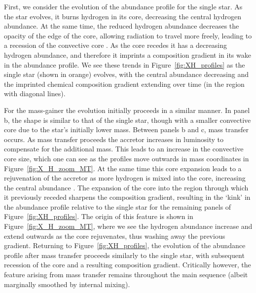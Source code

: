 \documentclass[twocolumn, twocolappendix, oneside]{aastex631}
\begin{document}
First, we consider the evolution of the abundance profile for the single star. As the star evolves, it burns hydrogen in its core, decreasing the central hydrogen abundance. At the same time, the reduced hydrogen abundance decreases the opacity of the edge of the core, allowing radiation to travel more freely, leading to a recession of the convective core \citep{Mitalas+1972,Crowe+1982,Miglio+2008,SilvaAguirre+2011}. As the core recedes it has a decreasing hydrogen abundance, and therefore it imprints a composition gradient in its wake in the abundance profile. We see these trends in Figure~\ref{fig:XH_profiles} as the single star (shown in orange) evolves, with the central abundance decreasing and the imprinted chemical composition gradient extending over time (in the region with diagonal lines).

For the mass-gainer the evolution initially proceeds in a similar manner. In panel b, the shape is similar to that of the single star, though with a smaller convective core due to the star's initially lower mass. Between panels b and c, mass transfer occurs. As mass transfer proceeds the accretor increases in luminosity to compensate for the additional mass. This leads to an increase in the convective core size, which one can see as the profiles move outwards in mass coordinates in Figure~\ref{fig:X_H_zoom_MT}. At the same time this core expansion leads to a rejuvenation of the accretor as more hydrogen is mixed into the core, increasing the central abundance \citep{Neo+1977}. The expansion of the core into the region through which it previously receded sharpens the composition gradient, resulting in the `kink' in the abundance profile relative to the single star for the remaining panels of Figure~\ref{fig:XH_profiles}. The origin of this feature is shown in Figure~\ref{fig:X_H_zoom_MT}, where we see the hydrogen abundance increase and extend outwards as the core rejuvenates, thus washing away the previous gradient. Returning to Figure~\ref{fig:XH_profiles}, the evolution of the abundance profile after mass transfer proceeds similarly to the single star, with subsequent recession of the core and a resulting composition gradient. Critically however, the feature arising from mass transfer remains throughout the main sequence (albeit marginally smoothed by internal mixing).
\end{document}
